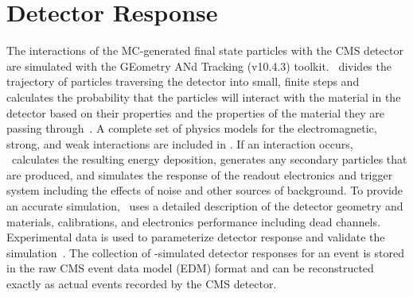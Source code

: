 \section{Detector Response}
The interactions of the MC-generated final state particles with the CMS detector are simulated with the GEometry ANd Tracking (\Geant v10.4.3) toolkit.
\Geant\ divides the trajectory of particles traversing the detector into small, finite steps and calculates the probability that the particles will interact with the material in the detector based on their properties and the properties of the material they are passing through~\cite{AGOSTINELLI2003250}.
A complete set of physics models for the electromagnetic, strong, and weak interactions are included in \Geant.
If an interaction occurs, \Geant\ calculates the resulting energy deposition, generates any secondary particles that are produced, and simulates the response of the readout electronics and trigger system including the effects of noise and other sources of background.
To provide an accurate simulation, \Geant\ uses a detailed description of the detector geometry and materials, calibrations, and electronics performance including dead channels.
Experimental data is used to parameterize detector response and validate the simulation~\cite{Bayatian:922757}.
The collection of \Geant-simulated detector responses for an event is stored in the raw CMS event data model (EDM) format and can be reconstructed exactly as actual events recorded by the CMS detector.